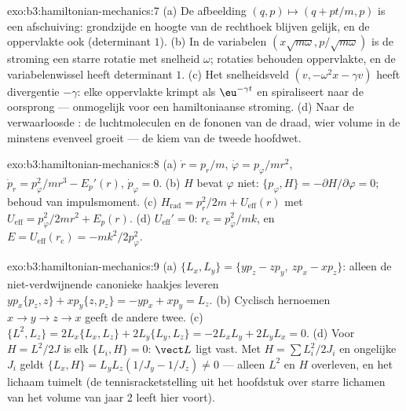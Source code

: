 \begin{solution}{exo:b3:hamiltonian-mechanics:7}
(a) De afbeelding $(q, p) \mapsto (q + pt/m, p)$ is een afschuiving:
grondzijde en hoogte van de rechthoek blijven gelijk, en de oppervlakte
ook (determinant $1$). (b) In de variabelen $(x\sqrt{m\omega}, p/\sqrt{m\omega})$ is de stroming een starre rotatie met snelheid
$\omega$; rotaties behouden oppervlakte, en de variabelenwissel heeft
determinant $1$. (c) Het snelheidsveld $(v, -\omega^2x - \gamma v)$ heeft
divergentie $-\gamma$: elke oppervlakte krimpt als $\eu^{-\gamma t}$ en
spiraliseert naar de oorsprong --- onmogelijk voor een hamiltoniaanse
stroming. (d) Naar de verwaarloosde : de luchtmoleculen en
de fononen van de draad, wier volume in de  minstens evenveel
groeit --- de kiem van de tweede hoofdwet.
\end{solution}

\begin{solution}{exo:b3:hamiltonian-mechanics:8}
(a) $\dot r = p_r/m$, $\dot\varphi = p_\varphi/mr^2$, $\dot p_r =
p_\varphi^2/mr^3 - E_p'(r)$, $\dot p_\varphi = 0$. (b) $H$ bevat
$\varphi$ niet: $\{p_\varphi, H\} = -\partial H/\partial\varphi =
0$; behoud van impulsmoment. (c) $H_{\text{rad}} = p_r^2/2m +
U_{\text{eff}}(r)$ met $U_{\text{eff}} = p_\varphi^2/2mr^2 + E_p(r)$.
(d) $U_{\text{eff}}' = 0$: $r_{\text{c}} = p_\varphi^2/mk$, en $E =
U_{\text{eff}}(r_{\text{c}}) = -mk^2/2p_\varphi^2$.
\end{solution}

\begin{solution}{exo:b3:hamiltonian-mechanics:9}
(a) $\{L_x, L_y\} = \{yp_z - zp_y,\ zp_x - xp_z\}$: alleen de
niet-verdwijnende canonieke haakjes leveren $yp_x\{p_z, z\} + xp_y\{z,
p_z\} = -yp_x + xp_y = L_z$. (b) Cyclisch hernoemen $x \to y \to z \to
x$ geeft de andere twee. (c) $\{L^2, L_z\} = 2L_x\{L_x, L_z\} +
2L_y\{L_y, L_z\} = -2L_xL_y + 2L_yL_x = 0$. (d) Voor $H = L^2/2J$ is
elk $\{L_i, H\} = 0$: $\vect L$ ligt vast. Met $H = \sum L_i^2/2J_i$
en ongelijke $J_i$ geldt $\{L_x, H\} = L_yL_z(1/J_y - 1/J_z) \neq 0$ ---
alleen $L^2$ en $H$ overleven, en het lichaam tuimelt (de
tennisracketstelling uit het hoofdstuk over starre lichamen van het
volume van jaar 2 leeft hier voort).
\end{solution}

